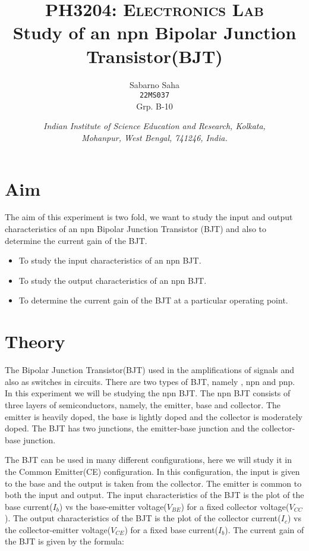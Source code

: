 \documentclass{scrartcl}
\title{
        \Large\textsc{PH3204: Electronics Lab} \\
        \vspace{10pt}
        \Huge \textbf{Study of an npn Bipolar Junction Transistor(BJT)} \\
}
\author{Sabarno Saha \\ \texttt{22MS037} \\ Grp. B-10}
\date{\normalsize
        \textit{Indian Institute of Science Education and Research, Kolkata, \\
        Mohanpur, West Bengal, 741246, India.}
}
\newcommand{\1}{\mathbbm{1}}
\begin{document}
\maketitle
\tableofcontents
\newpage
\section{Aim}

The aim of this experiment is two fold, we want to study the input and output characteristics of an npn
Bipolar Junction Transistor (BJT) and also to determine the current gain of the BJT.

\begin{itemize}
	\item To study the input characteristics of an npn BJT.
	\item To study the output characteristics of an npn BJT.
	\item To determine the current gain of the BJT at a particular operating point.
\end{itemize}



\section{Theory}
The Bipolar Junction Transistor(BJT) used in the amplifications of signals and also as switches in circuits. There are two types of BJT, namely , npn and pnp. In this experiment we will be studying the npn BJT.
 The npn BJT consists of three layers of semiconductors, namely, the emitter, base and collector. The emitter is heavily doped, the base is lightly doped and the collector is moderately doped. 
 The BJT has two junctions, the emitter-base junction and the collector-base junction. 

The BJT can be used in many different configurations, here we will study it in the Common Emitter(CE) configuration. In this configuration, the input is given to the base and the output is taken from the collector. 
The emitter is common to both the input and output. 
The input characteristics of the BJT is the plot of the base current($I_b$) vs the base-emitter voltage($V_{BE}$) for a fixed collector voltage($V_{CC}$). 
The output characteristics of the BJT is the plot of the collector current($I_c$) vs the collector-emitter voltage($V_{CE}$) for a fixed base current($I_b$). The current gain of the BJT is given by the formula:
\end{document}

